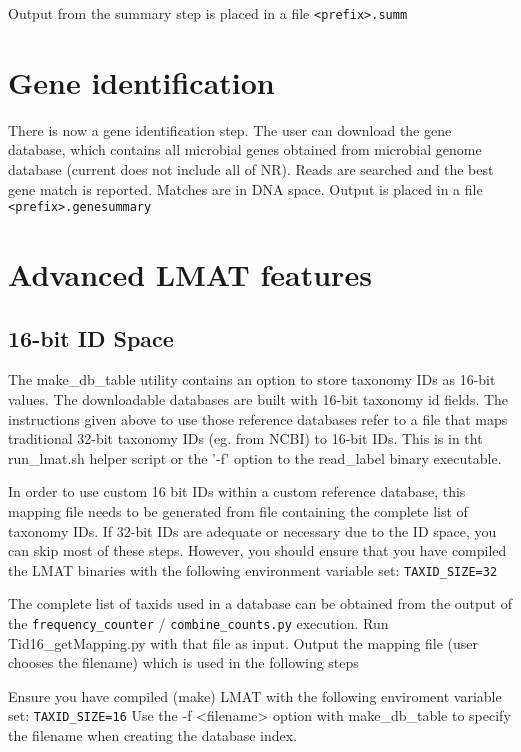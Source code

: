 \documentclass[11pt]{article}
\begin{document}
Output from the summary step is placed in a file \texttt{<prefix>.summ}

\section{Gene identification}

There is now a gene identification step.  The user can download the gene database, which contains all microbial genes obtained from microbial genome database (current does not include all of NR). Reads are searched and the best gene match is reported.  Matches are in DNA space. Output is placed in a file \texttt{<prefix>.genesummary}

\section{Advanced LMAT features}

\subsection{16-bit ID Space}

The make\_db\_table utility contains an option to store taxonomy IDs as 16-bit values.  The downloadable databases are built with 16-bit taxonomy id fields.  The instructions given above to use those reference databases refer to a file that maps traditional 32-bit taxonomy IDs (eg. from NCBI) to 16-bit IDs.  This is in tht run\_lmat.sh helper script or the '-f' option to the read\_label binary executable.

In order to use custom 16 bit IDs within a custom reference database, this mapping file  needs to be generated from file containing the complete list of taxonomy IDs.  If 32-bit IDs are adequate or necessary due to the ID space, you can skip most of these steps.  However, you should ensure that you have compiled the LMAT binaries with the following environment variable set:  \texttt{TAXID\_SIZE=32}  

  The complete list of taxids used in a database can be obtained from the output of the \texttt{frequency\_counter} / \texttt{combine\_counts.py} execution.  Run Tid16_getMapping.py with that file as input.  Output the mapping file (user chooses the filename) which is used in the following steps

Ensure you have compiled (make) LMAT with the following enviroment variable set:  \texttt{TAXID\_SIZE=16}
Use the -f <filename> option with make\_db\_table to specify the filename when creating the database index.
\end{document}

